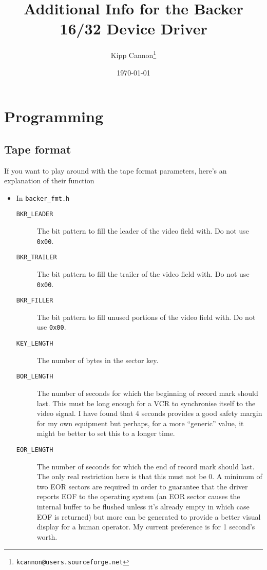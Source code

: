 \documentclass{article}
\title{Additional Info for the Backer 16/32 Device Driver}
\author{Kipp Cannon\footnote{\texttt{kcannon@users.sourceforge.net}}}
\date{\today}
\begin{document}
\maketitle

\section{Programming}

\subsection{Tape format}
\label{prog:format}

If you want to play around with the tape format parameters, here's an
explanation of their function
\begin{itemize}
\item
In \texttt{backer\_fmt.h}
\begin{description}
\item[\texttt{BKR\_LEADER}]
The bit pattern to fill the leader of the video field with.  Do not use
\texttt{0x00}.

\item[\texttt{BKR\_TRAILER}]
The bit pattern to fill the trailer of the video field with.  Do not use
\texttt{0x00}.

\item[\texttt{BKR\_FILLER}]
The bit pattern to fill unused portions of the video field with.  Do not
use \texttt{0x00}.

\item[\texttt{KEY\_LENGTH}]
The number of bytes in the sector key.

\item[\texttt{BOR\_LENGTH}]
The number of seconds for which the beginning of record mark should last.
This must be long enough for a VCR to synchronise itself to the video
signal.  I have found that 4 seconds provides a good safety margin for my
own equipment but perhaps, for a more ``generic'' value, it might be better
to set this to a longer time.

\item[\texttt{EOR\_LENGTH}]
The number of seconds for which the end of record mark should last.  The
only real restriction here is that this must not be 0.  A minimum of two
EOR sectors are required in order to guarantee that the driver reports EOF
to the operating system (an EOR sector causes the internal buffer to be
flushed unless it's already empty in which case EOF is returned) but more
can be generated to provide a better visual display for a human operator.
My current preference is for 1 second's worth.
\end{description}


\end{itemize}
\end{document}
